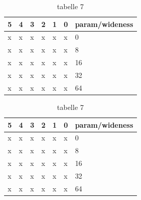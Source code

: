 \begin{table}[H]
\centering
\caption{tabelle 7}
\label{Integer overflow bug detection in CWE-190}
\begin{tabular}{|l|l|l|l|l|l|l|} \hline
\textbf{5}  & \textbf{4}     & \textbf{3}    &\textbf{2} & \textbf{1}  & \textbf{0} &\textbf{param/wideness}  \\ \hline 
x           &x               &x              &x          &x            &x           &0                         \\ \hline
x           &x               &x              &x          &x            &x           &8                         \\ \hline
x           &x               &x              &x          &x            &x           &16                         \\ \hline
x           &x               &x              &x          &x            &x           &32                         \\ \hline
x           &x               &x              &x          &x            &x           &64                         \\ \hline

\end{tabular}
\end{table}

\begin{table}[H]
\centering
\caption{tabelle 7}
\label{Integer overflow bug detection in CWE-190}
\begin{tabular}{|l|l|l|l|l|l|l|} \hline
\textbf{5}  & \textbf{4}     & \textbf{3}    &\textbf{2} & \textbf{1}  & \textbf{0} &\textbf{param/wideness}  \\ \hline 
x           &x               &x              &x          &x            &x           &0                         \\ \hline
x           &x               &x              &x          &x            &x           &8                         \\ \hline
x           &x               &x              &x          &x            &x           &16                         \\ \hline
x           &x               &x              &x          &x            &x           &32                         \\ \hline
x           &x               &x              &x          &x            &x           &64                         \\ \hline

\end{tabular}
\end{table}

